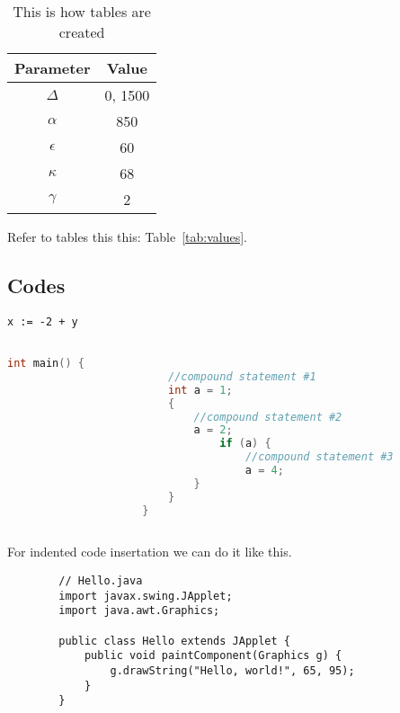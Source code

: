     \begin{table}[H] \center
    \begin{tabular}{c|c}
    Parameter & Value \\ \hline \hline
    $\Delta$ & 0, 1500 \\
    ${\alpha}$ & 850 \\
    ${\epsilon}$ & 60 \\
    ${\kappa}$ & 68 \\
    ${\gamma}$ & 2
    \end{tabular}
    \caption{This is how tables are created}
    \end{table}
    
    
    Refer to tables this this: Table~\ref{tab:values}.

    \subsection{Codes}

    \begin{lstlisting}[caption={My Captions},captionpos=b]
        x := -2 + y
        
        \end{lstlisting}
       
    \begin{lstlisting}[language=C,caption={[short caption]caption text}, captionpos=b]
                     int main() {
                         //compound statement #1 
                         int a = 1;
                         {       
                             //compound statement #2
                             a = 2;
                                 if (a) {
                                     //compound statement #3
                                     a = 4;
                             }
                         }
                     }
            
            \end{lstlisting}
    
    \pagebreak
    For indented code insertation we can do it like this.
    \begin{verbatim}
        // Hello.java
        import javax.swing.JApplet;
        import java.awt.Graphics;
    
        public class Hello extends JApplet {
            public void paintComponent(Graphics g) {
                g.drawString("Hello, world!", 65, 95);
            }    
        }
    
        \end{verbatim}


